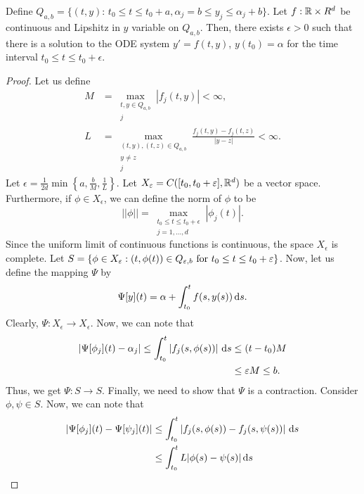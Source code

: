 \documentclass{article}
\begin{document}
\begin{theorem}{}
    Define $Q_{a, b} =  \{(t, y) : \, t_0 \leq t \leq t_0 + a, \alpha_j = b \leq y_j \leq \alpha_j + b\}$. Let $f: \mathbb{R} \times R^d$ be continuous and Lipshitz in $y$ variable on $Q_{a, b}$. Then, there exists $\epsilon > 0$ such that there is a solution to the ODE system $y' = f(t, y)$, $y(t_0) = \alpha$ for the time interval $t_0 \leq t \leq t_0 + \epsilon$.  
\end{theorem}
\begin{proof}
    Let us define
    \begin{align*}
        M &= \max_{\substack{t, y \in Q_{a, b}\\ j}}|f_j(t, y)| < \infty, \\
        L &= \max_{\substack{(t, y), (t, z) \in Q_{a, b} \\ y \neq z \\ j}} \frac{f_j(t, y) - f_j(t, z)}{|y - z|} < \infty.
    \end{align*}
    Let $\epsilon = \frac{1}{2d}\min \left\{a, \frac{b}{M}, \frac{1}{L} \right\}.$ Let $X_\varepsilon = C([t_0, t_0 + \varepsilon], \mathbb{R}^d)$ be a vector space. Furthermore, if $\phi \in X_\epsilon$, we can define the norm of $\phi$ to be 
    \[
        ||\phi|| = \max_{\substack{t_0 \leq t \leq t_0 + \epsilon \\ j = 1, \hdots, d}}|\phi_j(t)|.
    \]
    Since the uniform limit of continuous functions is continuous, the space $X_\epsilon$ is complete. Let $S = \{\phi \in X_\varepsilon : (t, \phi(t)) \in Q_{\varepsilon, b} \text{ for } t_0 \leq t \leq t_0 + \varepsilon\}$. Now, let us define the mapping $\Psi$ by 
        \[
            \Psi[y](t) = \alpha + \int_{t_0}^t f(s, y(s)) \, \text{d}s.
        \]
    Clearly, $\Psi : X_\epsilon \to X_\epsilon$. Now, we can note that 
        \begin{align*}
            |\Psi[\phi_j](t) - \alpha_j| \leq  \int_{t_0}^t \left|f_j(s, \phi(s))\right| \, \text{d}s &\leq (t - t_0) M \\
            &\leq \varepsilon M \leq b.
        \end{align*}
    Thus, we get $\Psi : S \to S$. Finally, we need to show that $\Psi$ is a contraction. Consider $\phi, \psi \in S$. Now, we can note that 
        \begin{align*}
            |\Psi[\phi_j](t) - \Psi[\psi_j](t)| &\leq \int_{t_0}^t \left| f_j(s, \phi(s)) - f_j(s, \psi(s))\right|\, \t{d}s \\
            &\leq \int_{t_0}^t L |\phi(s) - \psi(s)| \, \t{d}s\\

\end{align*}
\end{proof}
\end{document}
